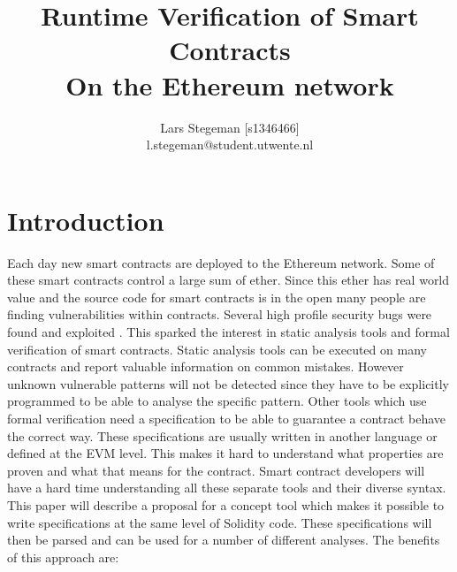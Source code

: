 \documentclass[a4paper]{article}
\title{Runtime Verification of Smart Contracts \\
\large On the Ethereum network \\}
\author{Lars Stegeman [s1346466]\\ l.stegeman@student.utwente.nl}
\begin{document}
\maketitle

\tableofcontents


\section{Introduction}
Each day new smart contracts are deployed to the Ethereum network. Some of these smart contracts control a large sum of ether. Since this ether has real world value and the source code for smart contracts is in the open many people are finding vulnerabilities within contracts. Several high profile security bugs were found and exploited \cite{parity1, parity2,hkg,dao}. This sparked the interest in static analysis tools and formal verification of smart contracts. Static analysis tools can be executed on many contracts and report valuable information on common mistakes. However unknown vulnerable patterns will not be detected since they have to be explicitly programmed to be able to analyse the specific pattern. Other tools which use formal verification need a specification to be able to guarantee a contract behave the correct way. These specifications are usually written in another language or defined at the EVM level. This makes it hard to understand what properties are proven and what that means for the contract. Smart contract developers will have a hard time understanding all these separate tools and their diverse syntax. This paper will describe a proposal for a concept tool which makes it possible to write specifications at the same level of Solidity code. These specifications will then be parsed and can be used for a number of different analyses. The benefits of this approach are:
\end{document}
